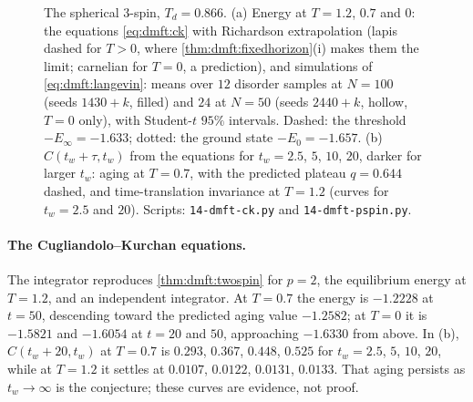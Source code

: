 \begin{refsection}
\begin{figure}[t]
\begin{fullwidth}
\end{fullwidth}
\caption{The spherical $3$-spin, $T_d=0.866$. (a) Energy at $T=1.2$, $0.7$ and $0$: the equations \eqref{eq:dmft:ck} with Richardson extrapolation (lapis dashed for $T>0$, where \cref{thm:dmft:fixedhorizon}(i) makes them the limit; carnelian for $T=0$, a prediction), and simulations of \eqref{eq:dmft:langevin}: means over $12$ disorder samples at $N=100$ (seeds $1430+k$, filled) and $24$ at $N=50$ (seeds $2440+k$, hollow, $T=0$ only), with Student-$t$ $95\%$ intervals. Dashed: the threshold $-E_\infty=-1.633$; dotted: the ground state $-E_0=-1.657$. (b) $C(t_w+\tau,t_w)$ from the equations for $t_w=2.5$, $5$, $10$, $20$, darker for larger $t_w$: aging at $T=0.7$, with the predicted plateau $q=0.644$ dashed, and time-translation invariance at $T=1.2$ (curves for $t_w=2.5$ and $20$). Scripts: \texttt{14-dmft-ck.py} and \texttt{14-dmft-pspin.py}.}\label{fig:dmft:pspin}
\end{figure}

\paragraph{The Cugliandolo--Kurchan equations.} The integrator reproduces \cref{thm:dmft:twospin} for $p=2$, the equilibrium energy at $T=1.2$, and an independent integrator. At $T=0.7$ the energy is $-1.2228$ at $t=50$, descending toward the predicted aging value $-1.2582$; at $T=0$ it is $-1.5821$ and $-1.6054$ at $t=20$ and $50$, approaching $-1.6330$ from above. In (b), $C(t_w+20,t_w)$ at $T=0.7$ is $0.293$, $0.367$, $0.448$, $0.525$ for $t_w=2.5$, $5$, $10$, $20$, while at $T=1.2$ it settles at $0.0107$, $0.0122$, $0.0131$, $0.0133$. That aging persists as $t_w\to\infty$ is the conjecture; these curves are evidence, not proof.


\end{refsection}
